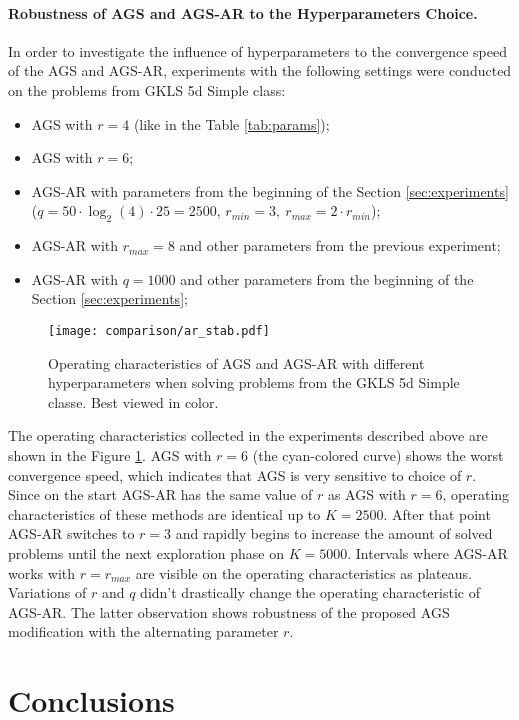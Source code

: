\paragraph{Robustness of AGS and AGS-AR to the Hyperparameters Choice.}

In order to investigate the influence of hyperparameters to the convergence speed of the AGS and AGS-AR,
experiments with the following settings were conducted on the problems from GKLS 5d Simple class:
\begin{itemize}
  \item AGS with $r=4$ (like in the Table \ref{tab:params});
  \item AGS with $r=6$;
  \item AGS-AR with parameters from the beginning of the Section \ref{sec:experiments}
  ($q=50\cdot\log_2(4)\cdot 25 = 2500$, $r_{min}=3,\:r_{max}=2\cdot r_{min}$);
  \item AGS-AR with $r_{max}=8$ and other parameters from the previous experiment;
  \item AGS-AR with $q=1000$ and other parameters from the beginning of the Section \ref{sec:experiments};
\end{itemize}

\begin{figure}[ht]
  \centering
  \texttt{[image: comparison/ar\_stab.pdf]}
  \caption{Operating characteristics of AGS and AGS-AR with different hyperparameters
  when solving problems from the GKLS 5d Simple classe. Best viewed in color.}
  \label{fig:stability}
\end{figure}

The operating characteristics collected in the experiments described above are shown in the Figure \ref{fig:stability}.
AGS with $r=6$ (the cyan-colored curve) shows the worst convergence speed, which indicates that AGS is very sensitive to choice of $r$.
Since on the start AGS-AR has the same value of $r$ as AGS with $r=6$, operating characteristics of these methods
are identical up to $K=2500$. After that point AGS-AR switches to $r=3$ and rapidly begins to increase the amount of solved problems
until the next exploration phase on $K=5000$. Intervals where AGS-AR works with $r=r_{max}$ are visible on the operating characteristics as plateaus.
Variations of $r$ and $q$ didn't drastically change the operating characteristic of AGS-AR. The latter observation shows robustness of the proposed
AGS modification with the alternating parameter $r$.

\section{Conclusions}


